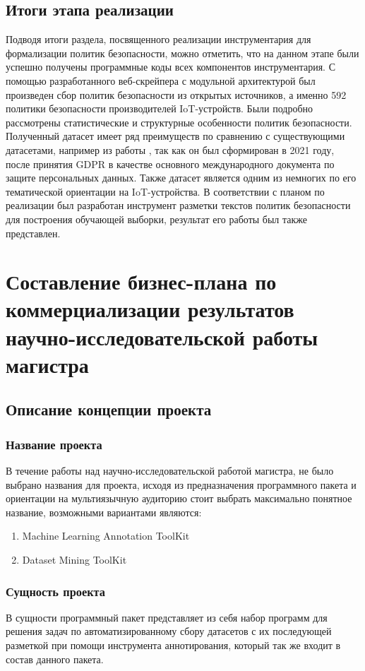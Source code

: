 \documentclass[../main]{subfiles}
\begin{document}
\subsection{Итоги этапа реализации}
Подводя итоги раздела, посвященного реализации инструментария для формализации политик безопасности, можно отметить, что на данном этапе были успешно получены программные коды всех компонентов инструментария. С помощью разработанного веб-скрейпера с модульной архитектурой был произведен сбор политик безопасности из открытых источников, а именно 592 политики безопасности производителей IoT-устройств. Были подробно рассмотрены статистические и структурные особенности политик безопасности. Полученный датасет имеет ряд преимуществ по сравнению с существующими датасетами, например из работы \cite{MDPI18}, так как он был сформирован в 2021 году, после принятия GDPR в качестве основного международного документа по защите персональных данных. Также датасет является одним из немногих по его тематической ориентации на IoT-устройства. В соответствии с планом по реализации был разработан инструмент разметки текстов политик безопасности для построения обучающей выборки, результат его работы был также представлен.

\newpage
\section{Составление бизнес-плана по коммерциализации результатов научно-исследовательской работы магистра}

\subsection{Описание концепции проекта}
\subsubsection{Название проекта}
В течение работы над научно-исследовательской работой магистра, не было выбрано названия для проекта, исходя из предназначения программного пакета и ориентации на мультиязычную аудиторию стоит выбрать максимально понятное название, возможными вариантами являются:
\begin{enumerate}
    \item Machine Learning Annotation ToolKit
    \item Dataset Mining ToolKit
\end{enumerate}

\subsubsection{Сущность проекта}
В сущности программный пакет представляет из себя набор программ для решения задач по автоматизированному сбору датасетов с их последующей разметкой при помощи инструмента аннотирования, который так же входит в состав данного пакета.
\end{document}
